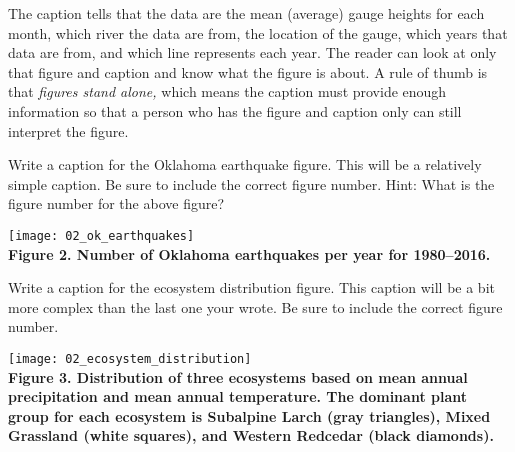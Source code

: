 \documentclass[12pt, hidelinks]{exam}
\begin{document}
\begin{questions}
\vspace{0.5\baselineskip}

The caption tells that the data are the mean (average) gauge heights for 
each month, which river the data are from, the location of the
gauge, which years that data are from, and which line represents each 
year. The reader can look at only that figure and caption and know what
the figure is about. A rule of thumb is that \emph{figures stand alone,} which means 
the caption must provide enough information so that a person who 
has the figure and caption only can still interpret the figure. 




\question
Write a caption for the Oklahoma earthquake figure. This will be 
a relatively simple caption. Be sure to include the correct figure 
number. Hint: What is the figure number for the above figure?

\hfil%
\begin{minipage}{0.7\textwidth}
	\texttt{[image: 02\_ok\_earthquakes]}\\
	
	\ifprintanswers 
		\textbf{Figure 2. Number of Oklahoma earthquakes per year for 1980–2016.}
		\vspace*{\baselineskip}
	\else
		\vspace{0.1\textheight}
	\fi
	
\end{minipage}%
\hfil


\question
Write a caption for the ecosystem distribution figure. This
caption will be a bit more complex than the last one your wrote.
Be sure to include  the correct figure number.

\hfil%
\begin{minipage}{0.7\textwidth}
	\texttt{[image: 02\_ecosystem\_distribution]}\\
	
	\ifprintanswers 
		\textbf{{\small Figure 3. Distribution of three ecosystems based on mean annual precipitation and mean annual temperature. The dominant plant group for each ecosystem is Subalpine Larch (gray triangles), Mixed Grassland (white squares), and Western Redcedar (black diamonds).}}
	\else
		\vspace{0.01\textheight}
	\fi
	

\end{minipage}
\end{questions}
\end{document}
